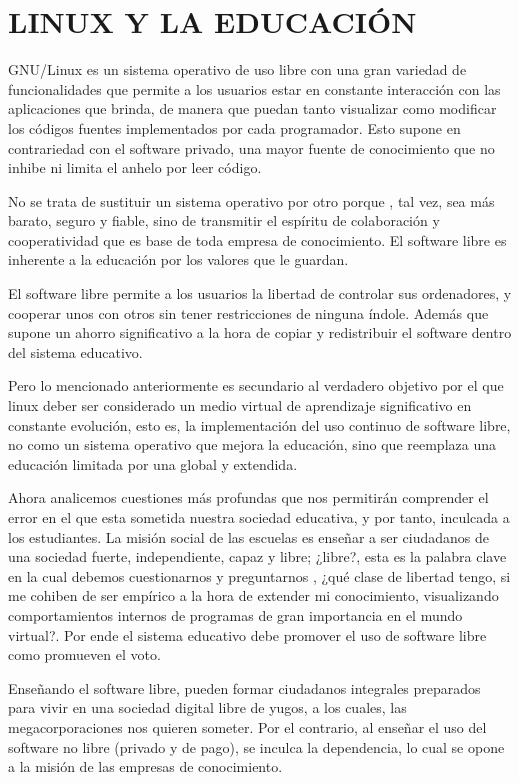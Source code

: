 \chapter*{LINUX Y LA EDUCACIÓN}
GNU/Linux es un sistema operativo de uso libre con una gran
variedad de funcionalidades que permite a los usuarios estar en
constante interacción con las aplicaciones que brinda, de
manera que puedan tanto visualizar como modificar los códigos
fuentes implementados por cada programador. Esto supone en
contrariedad con el software privado, una mayor fuente de
conocimiento que no inhibe ni limita el anhelo por leer código.

No se trata de sustituir un sistema operativo por otro porque ,
tal vez, sea más barato, seguro y fiable, sino de transmitir el
espíritu de colaboración y cooperatividad que es base de toda
empresa de conocimiento. El software libre es inherente a la
educación por los valores que le guardan.

El software libre permite a los usuarios la libertad de controlar
sus ordenadores, y cooperar unos con otros sin tener
restricciones de ninguna índole. Además que supone un ahorro
significativo a la hora de copiar y redistribuir el software dentro
del sistema educativo.

Pero lo mencionado anteriormente es secundario al verdadero
objetivo por el que linux deber ser considerado un medio virtual
de aprendizaje significativo en constante evolución, esto es, la
implementación del uso continuo de software libre, no como un
sistema operativo que mejora la educación, sino que reemplaza
una educación limitada por una global y extendida.

Ahora analicemos cuestiones más profundas que nos permitirán
comprender el error en el que esta sometida nuestra sociedad
educativa, y por tanto, inculcada a los estudiantes.
La misión social de las escuelas es enseñar a ser ciudadanos de
una sociedad fuerte, independiente, capaz y libre; ¿libre?, esta
es la palabra clave en la cual debemos cuestionarnos y
preguntarnos , ¿qué clase de libertad tengo, si me cohiben de
ser empírico a la hora de extender mi conocimiento, visualizando
comportamientos internos de programas de gran importancia en
el mundo virtual?. Por ende el sistema educativo debe promover
el uso de software libre como promueven el voto.
 
Enseñando el software libre, pueden formar ciudadanos
integrales preparados para vivir en una sociedad digital libre de
yugos, a los cuales, las megacorporaciones nos quieren someter.
Por el contrario, al enseñar el uso del software no libre (privado
y de pago), se inculca la dependencia, lo cual se opone a la
misión de las empresas de conocimiento.

